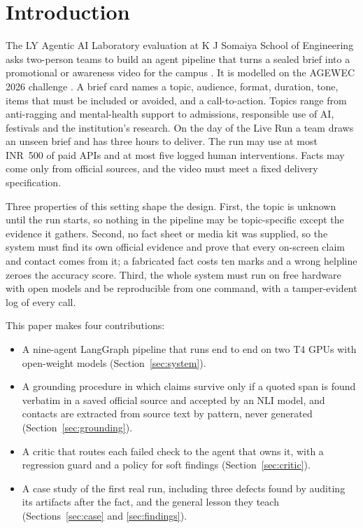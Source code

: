 \documentclass[twoside,11pt]{article}
\newcommand{\inr}{INR}
\begin{document}
\section{Introduction}

The LY Agentic AI Laboratory evaluation at K J Somaiya School of Engineering asks two-person teams to build an agent pipeline that turns a sealed brief into a promotional or awareness video for the campus \citep{kjsce2026handout}. It is modelled on the AGEWEC 2026 challenge \citep{agewec2026}. A brief card names a topic, audience, format, duration, tone, items that must be included or avoided, and a call-to-action. Topics range from anti-ragging and mental-health support to admissions, responsible use of AI, festivals and the institution's research. On the day of the Live Run a team draws an unseen brief and has three hours to deliver. The run may use at most \inr~500 of paid APIs and at most five logged human interventions. Facts may come only from official sources, and the video must meet a fixed delivery specification.

Three properties of this setting shape the design. First, the topic is unknown until the run starts, so nothing in the pipeline may be topic-specific except the evidence it gathers. Second, no fact sheet or media kit was supplied, so the system must find its own official evidence and prove that every on-screen claim and contact comes from it; a fabricated fact costs ten marks and a wrong helpline zeroes the accuracy score. Third, the whole system must run on free hardware with open models and be reproducible from one command, with a tamper-evident log of every call.

This paper makes four contributions:
\begin{itemize}
\item A nine-agent LangGraph pipeline \citep{langgraph2026} that runs end to end on two T4 GPUs with open-weight models (Section~\ref{sec:system}).
\item A grounding procedure in which claims survive only if a quoted span is found verbatim in a saved official source and accepted by an NLI model, and contacts are extracted from source text by pattern, never generated (Section~\ref{sec:grounding}).
\item A critic that routes each failed check to the agent that owns it, with a regression guard and a policy for soft findings (Section~\ref{sec:critic}).
\item A case study of the first real run, including three defects found by auditing its artifacts after the fact, and the general lesson they teach (Sections~\ref{sec:case} and \ref{sec:findings}).
\end{itemize}
\end{document}
